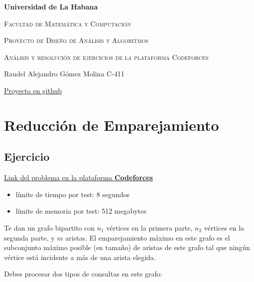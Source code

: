 \documentclass{article}
\begin{document}
\begin{titlepage}
    \centering
    {\bfseries\LARGE Universidad de La Habana \par}
    \vspace{1cm}
    {\scshape\Large Facultad de Matemática y Computación \par}
    \vspace{3cm}
    {\scshape\Huge Proyecto de Diseño de Análisis y Algoritmos\par}
    \vspace{1cm}
    {\scshape\Large Análisis y resolución de ejercicios de la plataforma Codeforces\par}
    \vfill

    {\Large Raudel Alejandro Gómez Molina C-411 \par}
    \vfill
    {\href{https://github.com/raudel25/DAA-Project}{Proyecto en github} \par}
\end{titlepage}

\tableofcontents

\newpage

\section{Reducción de Emparejamiento}

\subsection{Ejercicio}

\href{https://codeforces.com/contest/1721/problem/F}{Link del problema en la plataforma \textbf{Codeforces}}

\begin{itemize}
    \item límite de tiempo por test: 8 segundos
    \item límite de memoria por test: 512 megabytes
\end{itemize}

Te dan un grafo bipartito con $n_1$ vértices en la primera parte, $n_2$ vértices en la segunda parte, y $m$ aristas. El emparejamiento máximo en este grafo es el subconjunto máximo posible (en tamaño) de aristas de este grafo tal que ningún vértice está incidente a más de una arista elegida.

Debes procesar dos tipos de consultas en este grafo:
\end{document}
